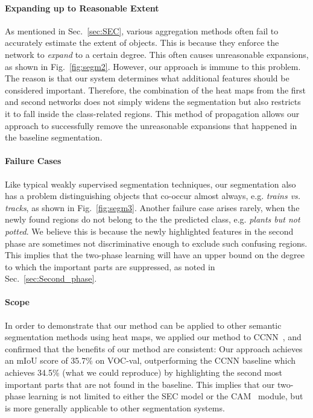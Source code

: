 \documentclass[10pt,twocolumn,letterpaper]{article}
\newcommand{\figref}[1]{Fig.~\ref{#1}}
\newcommand{\secref}[1]{Sec.~\ref{#1}}
\begin{document}
\paragraph{Expanding up to Reasonable Extent}\quad
As mentioned in \secref{sec:SEC}, various aggregation methods often fail to accurately estimate the extent of objects. This is because they enforce the network to \textit{expand} to a certain degree. This often causes unreasonable expansions, as shown in \figref{fig:segm2}. However, our approach is immune to this problem. The reason is that our system determines what additional features should be considered important. Therefore, the combination of the heat maps from the first and second networks does not simply widens the segmentation but also restricts it to fall inside the class-related regions. This method of propagation allows our approach to successfully remove the unreasonable expansions that happened in the baseline segmentation.

\paragraph{Failure Cases}\quad
Like typical weakly supervised segmentation techniques, our segmentation also has a problem distinguishing objects that co-occur almost always, e.g. \textit{trains vs. tracks}, as shown in \figref{fig:segm3}. Another failure case arises rarely, when the newly found regions do not belong to the the predicted class, e.g. \textit{plants but not potted}. We believe this is because the newly highlighted features in the second phase are sometimes not discriminative enough to exclude such confusing regions. This implies that the two-phase learning will have an upper bound on the degree to which the important parts are suppressed, as noted in \secref{sec:Second_phase}.

\paragraph{Scope}\quad
In order to demonstrate that our method can be applied to other semantic segmentation methods using heat maps, we applied our method to CCNN~\cite{pathakICCV15ccnn}, and confirmed that the benefits of our method are consistent: Our approach achieves an mIoU score of 35.7\% on VOC-val, outperforming the CCNN baseline which achieves 34.5\% (what we could reproduce) by highlighting the second most important parts that are not found in the baseline. This implies that our two-phase learning is not limited to either the SEC model or the CAM~\cite{zhou2016cvpr} module, but is more generally applicable to other segmentation systems.
\end{document}
